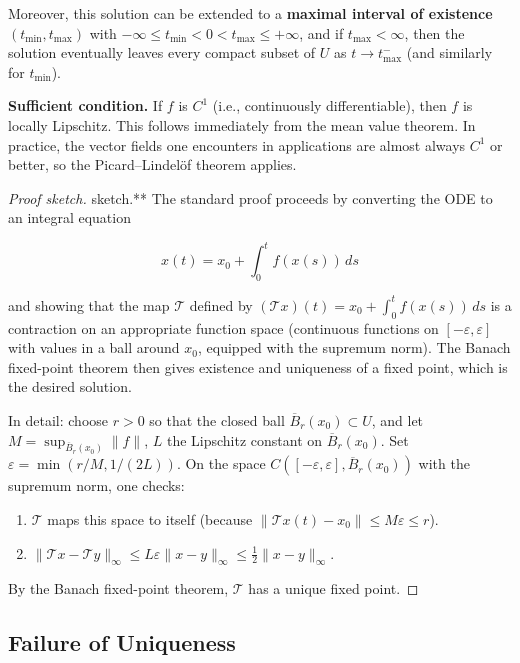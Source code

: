 Moreover, this solution can be extended to a \textbf{maximal interval of existence} $(t_{\min}, t_{\max})$ with $-\infty \leq t_{\min} < 0 < t_{\max} \leq +\infty$, and if $t_{\max} < \infty$, then the solution eventually leaves every compact subset of $U$ as $t \to t_{\max}^-$ (and similarly for $t_{\min}$).

\textbf{Sufficient condition.} If $f$ is $C^1$ (i.e., continuously differentiable), then $f$ is locally Lipschitz. This follows immediately from the mean value theorem. In practice, the vector fields one encounters in applications are almost always $C^1$ or better, so the Picard--Lindel\"of theorem applies.

\begin{proof}[Proof sketch]
sketch.** The standard proof proceeds by converting the ODE to an integral equation

\[
x(t) = x_0 + \int_0^t f(x(s))\, ds
\]

and showing that the map $\mathcal{T}$ defined by $(\mathcal{T} x)(t) = x_0 + \int_0^t f(x(s))\,ds$ is a contraction on an appropriate function space (continuous functions on $[-\varepsilon, \varepsilon]$ with values in a ball around $x_0$, equipped with the supremum norm). The Banach fixed-point theorem then gives existence and uniqueness of a fixed point, which is the desired solution.

In detail: choose $r > 0$ so that the closed ball $\overline{B}_r(x_0) \subset U$, and let $M = \sup_{\overline{B}_r(x_0)} \|f\|$, $L$ the Lipschitz constant on $\overline{B}_r(x_0)$. Set $\varepsilon = \min(r/M, 1/(2L))$. On the space $C([-\varepsilon,\varepsilon], \overline{B}_r(x_0))$ with the supremum norm, one checks:

\begin{enumerate}[nosep]
  \item $\mathcal{T}$ maps this space to itself (because $\|\mathcal{T}x(t) - x_0\| \leq M\varepsilon \leq r$).
  \item $\|\mathcal{T}x - \mathcal{T}y\|_\infty \leq L\varepsilon \|x - y\|_\infty \leq \frac{1}{2}\|x - y\|_\infty$.
\end{enumerate}

By the Banach fixed-point theorem, $\mathcal{T}$ has a unique fixed point.
\end{proof}


\subsection{Failure of Uniqueness}\label{sec:3.2.2}

